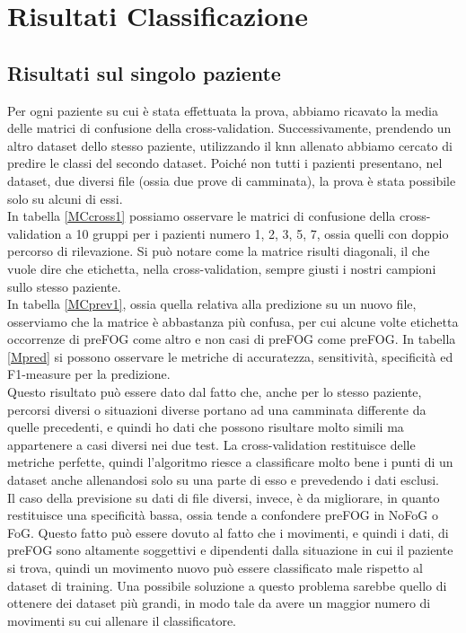 \section{Risultati Classificazione}
\subsection{Risultati sul singolo paziente}
Per ogni paziente su cui è stata effettuata la prova, abbiamo ricavato la media delle matrici di confusione della cross-validation. Successivamente, prendendo un altro dataset dello stesso paziente, utilizzando il knn allenato abbiamo cercato di predire le classi del secondo dataset. Poiché non tutti i pazienti presentano, nel dataset, due diversi file (ossia due prove di camminata), la prova è stata possibile solo su alcuni di essi.\\
In tabella \ref{MCcross1} possiamo osservare le matrici di confusione della cross-validation a 10 gruppi per i pazienti numero 1, 2, 3, 5, 7, ossia quelli con doppio percorso di rilevazione. Si può notare come la matrice risulti diagonali, il che vuole dire che etichetta, nella cross-validation, sempre giusti i nostri campioni sullo stesso paziente.\\
In tabella \ref{MCprev1}, ossia quella relativa alla predizione su un nuovo file, osserviamo che la matrice è abbastanza più confusa, per cui alcune volte etichetta occorrenze di preFOG come altro e non casi di preFOG come preFOG. In tabella \ref{Mpred} si possono osservare le metriche di accuratezza, sensitività, specificità ed F1-measure per la predizione.\\
Questo risultato può essere dato dal fatto che, anche per lo stesso paziente, percorsi diversi o situazioni diverse portano ad una camminata differente da quelle precedenti, e quindi ho dati che possono risultare molto simili ma appartenere a casi diversi nei due test. La cross-validation restituisce delle metriche perfette, quindi l'algoritmo riesce a classificare molto bene i punti di un dataset anche allenandosi solo su una parte di esso e prevedendo i dati esclusi.\\
Il caso della previsione su dati di file diversi, invece, è  da migliorare, in quanto restituisce una specificità bassa, ossia tende a confondere preFOG in NoFoG o FoG. Questo fatto può essere dovuto al fatto che i movimenti, e quindi i dati, di preFOG sono altamente soggettivi e dipendenti dalla situazione in cui il paziente si trova, quindi un movimento nuovo può essere classificato male rispetto al dataset di training. Una possibile soluzione a questo problema sarebbe quello di ottenere dei dataset più grandi, in modo tale da avere un maggior numero di movimenti su cui allenare il classificatore.
